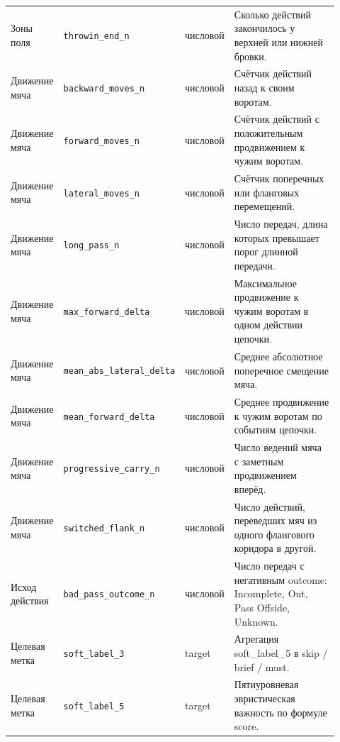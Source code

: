 \begin{landscape}
\begin{longtable}{>{\raggedright\arraybackslash}p{0.15\linewidth}>{\raggedright\arraybackslash}p{0.24\linewidth}>{\raggedright\arraybackslash}p{0.13\linewidth}>{\raggedright\arraybackslash}p{0.40\linewidth}}
Зоны поля & \texttt{throwin\_end\_n} & числовой & Сколько действий закончилось у верхней или нижней бровки. \\
Движение мяча & \texttt{backward\_moves\_n} & числовой & Счётчик действий назад к своим воротам. \\
Движение мяча & \texttt{forward\_moves\_n} & числовой & Счётчик действий с положительным продвижением к чужим воротам. \\
Движение мяча & \texttt{lateral\_moves\_n} & числовой & Счётчик поперечных или фланговых перемещений. \\
Движение мяча & \texttt{long\_pass\_n} & числовой & Число передач, длина которых превышает порог длинной передачи. \\
Движение мяча & \texttt{max\_forward\_delta} & числовой & Максимальное продвижение к чужим воротам в одном действии цепочки. \\
Движение мяча & \texttt{mean\_abs\_lateral\_delta} & числовой & Среднее абсолютное поперечное смещение мяча. \\
Движение мяча & \texttt{mean\_forward\_delta} & числовой & Среднее продвижение к чужим воротам по событиям цепочки. \\
Движение мяча & \texttt{progressive\_carry\_n} & числовой & Число ведений мяча с заметным продвижением вперёд. \\
Движение мяча & \texttt{switched\_flank\_n} & числовой & Число действий, переведших мяч из одного флангового коридора в другой. \\
Исход действия & \texttt{bad\_pass\_outcome\_n} & числовой & Число передач с негативным outcome: Incomplete, Out, Pass Offside, Unknown. \\
Целевая метка & \texttt{soft\_label\_3} & target & Агрегация soft\_label\_5 в skip / brief / must. \\
Целевая метка & \texttt{soft\_label\_5} & target & Пятиуровневая эвристическая важность по формуле score. \\
\bottomrule
\end{longtable}
\end{landscape}
